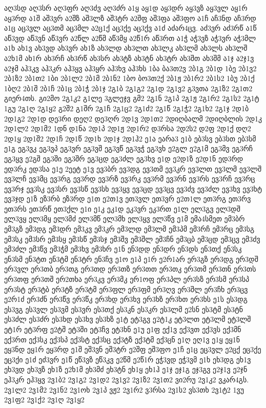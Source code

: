 {აღ3სდ
აღ3სრ
აღ3ფრ
აღ3ძვ
აღ3ძრ
ა1ყ
აყ1დ
აყ3დრ
აყ3ვზ
აყ3ვლ
აყ1რ
აყ3რდ
ა1შ
აშ3ვრ
ა2შზ
აშ3ლზ
აშ3ტრ
ა2შფ
აშ3ფა
აშ3ფო
ა1ჩ
აჩ3ნდ
აჩ3რდ
ა1ც
აც3ვლ
აც3თმ
აც3მლ
ა2ც1ქ
აც3ქე
აც3ქვ
ა1ძ
აძარ4ცვ.
აძ3ვრ
აძ3რწ
ა1წ
აწ3ვდ
აწ3ვნ
აწ3ვრ
ა2წლ
ა2წმ
აწ3მყ
ა2წ1რ
აწ3რთ
ა1ჭ
აჭ3ვზ
აჭ3ვრ
აჭ3მლ
ა1ხ
ახ1ვ
ახ3ვდ
ახ3ვრ
ახ1ზ
ახ3ლდ
ახ3ლთ
ახ3ლკ
ახ3ლმ
ახ3ლს
ახ3ლშ
ა2ხ1მ
ახ1რ
ახ3რჩ
ახ3რწ
ახ3სრ
ახ3ტზ
ახ3ტნ
ახ3ტრ
ახ3შთ
ახ3შმ
ა1ჯ
ა2ჯ1ვ
ა2ჯმ
აჰ3კვ
აჰ3კრ
აჰ3ყვ
აჰ3ყრ
აჰ3ხვ
აჰ3ხს
1ბა
ბა3თ2ვ
2ბ1გ
2ბ1დ
1ბე
2ბ1ვ2
2ბ1ზ2
2ბ1თ2
1ბი
2ბ1ლ2
2ბ1მ
2ბ1ნ2
1ბო
ბო3თ2ქ
2ბ1ჟ
2ბ1რ2
2ბ1ს2
1ბუ
2ბ1ქ
1ბღ2
2ბ1შ
2ბ1ჩ
2ბ1ც
2ბ1ჭ
2ბ1ჯ
2გ1ბ
2გ1გ2
2გ1დ
2გ1ვ2
გ3ვთა
2გ1ზ2
2გ1თ2
გიერ4თს.
გი2მო
2გ1კ2
გ1ლე
3გლეჯვ
გმ2
2გ1ნ
2გ1პ
2გ1ჟ
2გ1რ2
2გ1ს2
2გ1ტ
1გუ
2გ1ღ
2გ1ყ2
გ2შ2
გ1შრ
2გ1ჩ
2გ1ც2
2გ1ძ2
2გ1წ
2გ1ჭ2
2გ1ხ2
2გ1ჯ
2დ1ბ
2დ1გ2
2დ1დ
დე3რი
დეღ2
დე3ღრ
2დ1ვ
2დ1თ2
2დიღბალმ
2დიღბლის
2დ1კ
2დ1ლ2
2დ1მ2
1დნ
დ1ნა
2დ1პ
2დ1ჟ
2დ1რ2
დ3რსა
2დ2ს2
დ2ფ
2დ1ქ
დღ2
2დ1ყ
2დ1შ2
2დ1ჩ
2დ1წ
2დ1ხ
2დ1ჯ
2დ1ჰ2
ე1ა
ეარა3
ე1ბ
ებ3სვ
ებ3სთ
ებ3სმ
ე1გ
ეგ3ვკ
ეგ3ვპ
ეგ3ვრ
ეგ3ვშ
ეგ3ვწ
ეგ3ვჭ
ეგ3ვხ
ე2გლ
ე2გ1მ
ეგ3მვ
ეგ3რჩ
ეგ3ყვ
ე2გშ
ეგ3ში
ეგ3შრ
ეგ3ცდ
ეგ3ძლ
ეგ3ხვ
ე1დ
ე2დ1ზ
ე2დ1ნ
ედ3რდ
ედ3რკ
ედ3სა
ე1ე
2ეეტ
ე1ვ
ევ3ბრ
ევ3დგ
ევ3თმ
ევ3კრ
ევ3ლთ
ევ3ლმ
ევ3ლშ
ევ3ლჩ
ევ3მც
ევ3რგ
ევ3რდ
ევ3რზ
ევ3რკ
ევ3რმ
ევ3რნ
ევ3რს
ევ3რჩ
ევ3რც
ევ3რჯ
ევ3სკ
ევ3სრ
ევ3სწ
ევ3სხ
ევ3ყვ
ევ3ცდ
ევ3ცვ
ევ3ძვ
ევ3ძლ
ევ3ხვ
ევ3ხტ
ევ3ჯდ
ე1ზ
ეზ3რბ
ეზ3რდ
ე1თ
ე2თ1ვ
ეთ3ვლ
ეთ3ვრ
ე2თ1ლ
ეთ3რგ
ეთ3რვ
ეთ3რს
ეთ3რწ
ეთ3ქლ
ე1ი
ე1კ
ეკ1დ
ეკ3ვრ
ეკ3რთ
ე1ლ
ელ3გვ
ელ3დშ
ელ3ვყ
ელ3მყ
ელ3მძ
ელ3მწ
ელ3მხ
ელ3ყვ
ელ3წვ
ე1მ
ემა4სმეთ
ემ3ბრ
ემ3გზ
ემ3დგ
ემ3დრ
ემ3კვ
ემ3კრ
ემ3ლდ
ემ3ლმ
ემ3პმ
ემ3რჩ
ემ3რც
ემ3სგ
ემ3სკ
ემ3სრ
ემ3სყ
ემ3სწ
ემ3სჯ
ემ3შვ
ემ3შლ
ემ3ჩნ
ემ3ცბ
ემ3ცდ
ემ3ცვ
ემ3ძვ
ემ3ძლ
ემ3წვ
ემ3ჭმ
ემ3ხვ
ემ3ხრ
ე1ნ
ენ3დდ
ენ3დრ
ენ3დს
ენ3თქ
ენ3სკ
ენ3სმ
ენ3ტთ
ენ3ტმ
ენ3ტრ
ენ3ჩვ
ე1ო
ე1პ
ე1რ
ე2რ1არ
ერ3გზ
ერ3დგ
ერ3დშ
ერ3ვლ
ერ3თბ
ერ3თგ
ერ3თდ
ერ3თზ
ერ3თთ
ერ3თკ
ერ3თმ
ერ3თნ
ერ3თს
ერ3თფ
ერ3თშ
ერ2თხა
ერ3კვ
ერ3მკ
ერ1ოფ
ერ3პლ
ერ3სზ
ერ3სმ
ერ3სპ
ერ3სტ
ერ3ტბ
ერ3ტზ
ერ3ტმ
ერ3ფლ
ერ3ფმ
ერ3ღვ
ერ3შლ
ერ3ჩხ
ერ3ცვ
ე2რ1ძ
ერ3ძნ
ერ3წვ
ერ3წკ
ერ3ხდ
ერ3ხვ
ერ3ხზ
ერ3ხთ
ერ3ხს
ე1ს
ეს3დგ
ეს3ვგ
ეს3ვლ
ეს3ვმ
ეს3ვრ
ეს3თქ
ეს3კნ
ეს3კრ
ეს3ლმ
ე2სნ
ეს3ტმ
ეს3ტნ
ეს3ძლ
ეს3ძრ
ეს3ხდ
ეს3ხვ
ეს3ხზ
ე1ტ
ეტ3გვ
ე2ტ1კ
ეტ3ლთ
ეტ3ლმ
ეტ3ლშ
ეტ1რ
ეტ3რფ
ე2ტშ
ეტ3ში
ეტ3ჩვ
ეტ3ხნ
ე1უ
ე1ფ
ექ1ვ
ექ3ვთ
ექ3ვს
ექ3მნ
ექ3რთ
ექ3სკ
ექ3სპ
ექ3სტ
ექ3სც
ექ3ტზ
ექ3ტმ
ექ3ცნ
ე1ღ
ეღ1ვ
ე1ყ
ეყ1ნ
ეყ3ნდ
ეყ1რ
ეყ3რდ
ე1შ
ეშ3ვნ
ეშ3ტრ
ე2შფ
ეშ3ფო
ე1ჩ
ე1ც
ეც3ვლ
ე2ცქ
ეც3ქე
ეც3ქი
ე1ძ
ეძ3ვრ
ე1წ
ეწ3ვზ
ეწ3კვ
ე2წმ
ე2წ1რ
ეჭ3ვდ
ეჭ3ვმ
ე1ხ
ეხ3დგ
ეხ1ვ
ეხ3ვდ
ეხ3ვზ
ეხ1ზ
ე2ხ1მ
ეხ3მძ
ეხ3ტნ
ეხ1ყ
ეხ1ჰ
ე1ჯ
ეჯ1გ
ეჯ3გვ
ე2ჯ1ვ
ე2ჯნ
ეჰ3კრ
ეჰ3ყვ
2ვ1ბ2
2ვ1გ2
2ვ1დ2
2ვ1ვ2
2ვ1ზ2
2ვ1თ2
ვი2რუ
2ვ1კ2
ვკარ4გს.
2ვ1ლ2
2ვ1მ2
2ვ1ნ2
2ვ1ოხ
2ვ1პ
ვჟ2
2ვ1რ2
ვ3რსა
2ვ1ს2
ვს3თხ
2ვ1ტ2
1ვუ
2ვ1ფ2
2ვ1ქ2
2ვ1ღ
2ვ1ყ2
}
